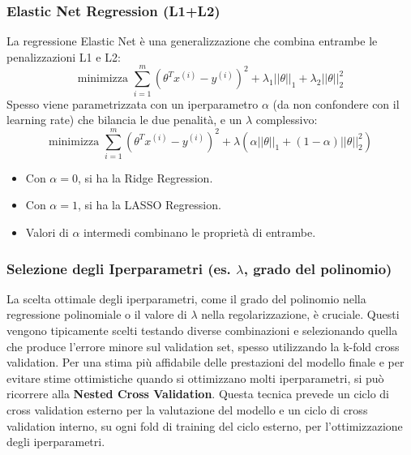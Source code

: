 \documentclass{article}
\begin{document}
\subsubsection{Elastic Net Regression (L1+L2)}
La regressione Elastic Net è una generalizzazione che combina entrambe le penalizzazioni L1 e L2:
$$ \text{minimizza } \sum_{i=1}^{m} (\theta^T x^{(i)} - y^{(i)})^2 + \lambda_1 ||\theta||_1 + \lambda_2 ||\theta||_2^2 $$
Spesso viene parametrizzata con un iperparametro $\alpha$ (da non confondere con il learning rate) che bilancia le due penalità, e un $\lambda$ complessivo:
$$ \text{minimizza } \sum_{i=1}^{m} (\theta^T x^{(i)} - y^{(i)})^2 + \lambda \left( \alpha ||\theta||_1 + (1-\alpha) ||\theta||_2^2 \right) $$
\begin{itemize}
    \item Con $\alpha=0$, si ha la Ridge Regression.
    \item Con $\alpha=1$, si ha la LASSO Regression.
    \item Valori di $\alpha$ intermedi combinano le proprietà di entrambe.
\end{itemize}

\subsubsection{Selezione degli Iperparametri (es. $\lambda$, grado del polinomio)}
La scelta ottimale degli iperparametri, come il grado del polinomio nella regressione polinomiale o il valore di $\lambda$ nella regolarizzazione, è cruciale. Questi vengono tipicamente scelti testando diverse combinazioni e selezionando quella che produce l'errore minore sul validation set, spesso utilizzando la k-fold cross validation.
Per una stima più affidabile delle prestazioni del modello finale e per evitare stime ottimistiche quando si ottimizzano molti iperparametri, si può ricorrere alla \textbf{Nested Cross Validation}. Questa tecnica prevede un ciclo di cross validation esterno per la valutazione del modello e un ciclo di cross validation interno, su ogni fold di training del ciclo esterno, per l'ottimizzazione degli iperparametri.
\end{document}
